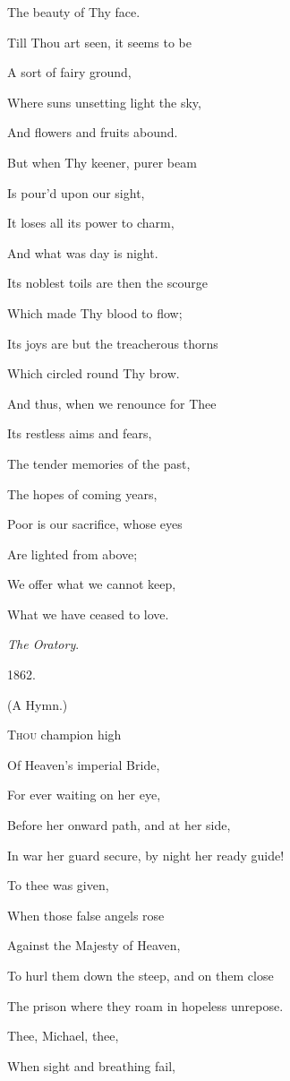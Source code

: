 The beauty of Thy
face.

Till Thou art seen, it seems to be

A sort of fairy
ground,

Where suns unsetting light the sky,

And flowers and
fruits abound.

But when Thy keener, purer beam

Is pour'd upon our
sight,

It loses all its power to charm,

And what was day is
night. 

Its noblest toils are then the scourge

Which made Thy
blood to flow;

Its joys are but the treacherous thorns

Which circled round
Thy brow.

And thus, when we renounce for Thee

Its restless aims
and fears,

The tender memories of the past,

The hopes of coming
years,

Poor is our sacrifice, whose eyes

Are lighted from
above;

We offer what we cannot keep,

What we have ceased
to love.

\emph{The Oratory}.

1862.


(A Hymn.)

T\textsc{hou} champion high

Of Heaven's imperial Bride,

For ever waiting on
her eye,

Before her onward path, and at her side,

In war her guard secure, by night her ready guide!

To thee was given,

When those false angels rose

Against the Majesty
of Heaven,

To hurl them down the steep, and on them
close

The prison where they roam in hopeless unrepose.

Thee, Michael, thee,

When sight and breathing fail,


